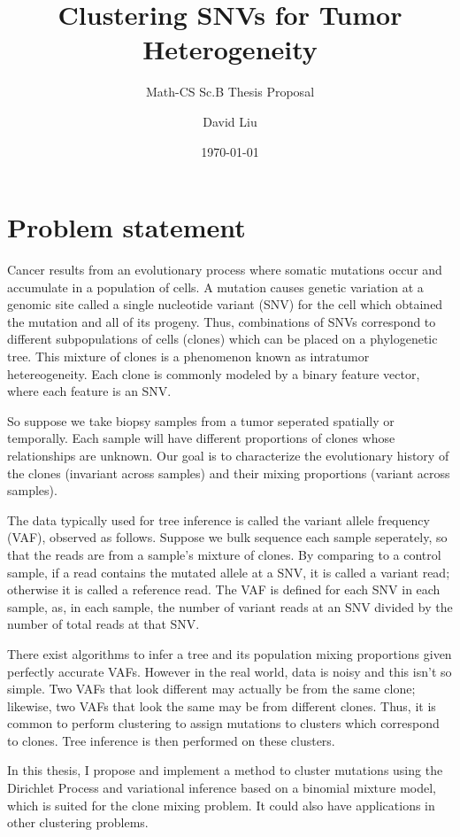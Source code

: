 \documentclass[11pt]{article}
\title{Clustering SNVs for Tumor Heterogeneity}
\subtitle{Math-CS Sc.B Thesis Proposal}
\date{\today}
\author{David Liu}
\begin{document}
\maketitle
\section{Problem statement}
Cancer results from an evolutionary process where somatic mutations occur and accumulate in a population of cells. A mutation causes genetic variation at a genomic site called a single nucleotide variant (SNV) for the cell which obtained the mutation and all of its progeny. Thus, combinations of SNVs correspond to different subpopulations of cells (clones) which can be placed on a phylogenetic tree. This mixture of clones is a phenomenon known as intratumor hetereogeneity. Each clone is commonly modeled by a binary feature vector, where each feature is an SNV.

So suppose we take biopsy samples from a tumor seperated spatially or temporally. Each sample will have different proportions of clones whose relationships are unknown. Our goal is to characterize the evolutionary history of the clones (invariant across samples) and their mixing proportions (variant across samples). 

The data typically used for tree inference is called the variant allele frequency (VAF), observed as follows. Suppose we bulk sequence each sample seperately, so that the reads are from a sample's mixture of clones. By comparing to a control sample, if a read contains the mutated allele at a SNV, it is called a variant read; otherwise it is called a reference read. The VAF is defined for each SNV in each sample, as, in each sample, the number of variant reads at an SNV divided by the number of total reads at that SNV.

There exist algorithms to infer a tree and its population mixing proportions given perfectly accurate VAFs. However in the real world, data is noisy and this isn't so simple. Two VAFs that look different may actually be from the same clone; likewise, two VAFs that look the same may be from different clones. Thus, it is common to perform clustering to assign mutations to clusters which correspond to clones. Tree inference is then performed on these clusters.

In this thesis, I propose and implement a method to cluster mutations using the Dirichlet Process and variational inference based on a binomial mixture model, which is suited for the clone mixing problem. It could also have applications in other clustering problems.
\end{document}
